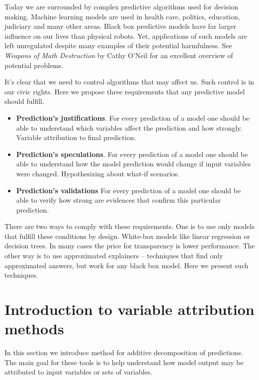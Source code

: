 \documentclass[]{book}
\providecommand{\tightlist}{%
  \setlength{\itemsep}{0pt}\setlength{\parskip}{0pt}}
\theoremstyle{definition}
\theoremstyle{definition}
\theoremstyle{definition}
\theoremstyle{remark}
\begin{document}
Today we are surrounded by complex predictive algorithms used for
decision making. Machine learning models are used in health care,
politics, education, judiciary and many other areas. Black box
predictive models have far larger influence on our lives than physical
robots. Yet, applications of such models are left unregulated despite
many examples of their potential harmfulness. See \emph{Weapons of Math
Destruction} by Cathy O'Neil for an excellent overview of potential
problems.

It's clear that we need to control algorithms that may affect us. Such
control is in our civic rights. Here we propose three requirements that
any predictive model should fulfill.

\begin{itemize}
\tightlist
\item
  \textbf{Prediction's justifications}. For every prediction of a model
  one should be able to understand which variables affect the prediction
  and how strongly. Variable attribution to final prediction.
\item
  \textbf{Prediction's speculations}. For every prediction of a model
  one should be able to understand how the model prediction would change
  if input variables were changed. Hypothesizing about what-if
  scenarios.
\item
  \textbf{Prediction's validations} For every prediction of a model one
  should be able to verify how strong are evidences that confirm this
  particular prediction.
\end{itemize}

There are two ways to comply with these requirements. One is to use only
models that fulfill these conditions by design. White-box models like
linear regression or decision trees. In many cases the price for
transparency is lower performance. The other way is to use approximated
explainers -- techniques that find only approximated answers, but work
for any black box model. Here we present such techniques.

\hypertarget{introduction-to-variable-attribution-methods}{%
\chapter{Introduction to variable attribution
methods}\label{introduction-to-variable-attribution-methods}}

In this section we introduce method for additive decomposition of
predictions. The main goal for these tools is to help understand how
model output may be attributed to input variables or sets of variables.
\end{document}
